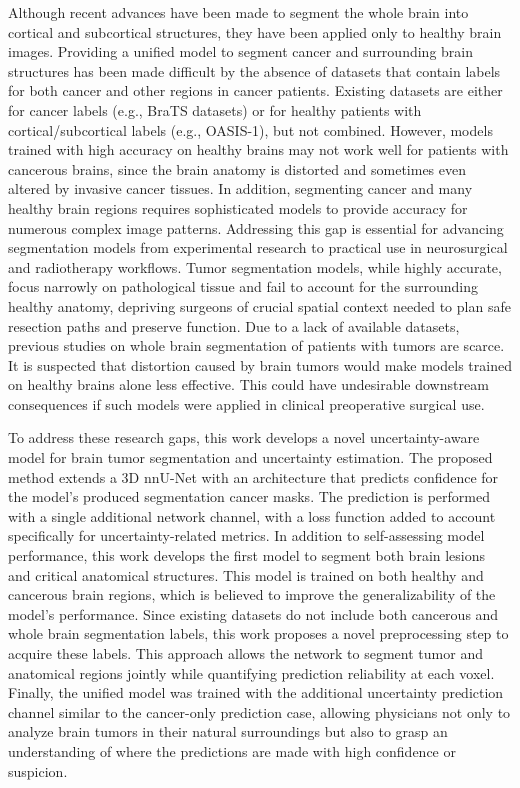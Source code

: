 \documentclass[11pt,letterpaper]{article}
\begin{document}
Although recent advances have been made to segment the whole brain into cortical and subcortical structures, they have been applied only to healthy brain images. Providing a unified model to segment cancer and surrounding brain structures has been made difficult by the absence of datasets that contain labels for both cancer and other regions in cancer patients. Existing datasets are either for cancer labels (e.g., BraTS datasets) or for healthy patients with cortical/subcortical labels (e.g., OASIS-1), but not combined. However, models trained with high accuracy on healthy brains may not work well for patients with cancerous brains, since the brain anatomy is distorted and sometimes even altered by invasive cancer tissues. In addition, segmenting cancer and many healthy brain regions requires sophisticated models to provide accuracy for numerous complex image patterns.
Addressing this gap is essential for advancing segmentation models from experimental research to practical use in neurosurgical and radiotherapy workflows. Tumor segmentation models, while highly accurate, focus narrowly on pathological tissue and fail to account for the surrounding healthy anatomy, depriving surgeons of crucial spatial context needed to plan safe resection paths and preserve function. Due to a lack of available datasets, previous studies on whole brain segmentation of patients with tumors are scarce. It is suspected that distortion caused by brain tumors would make models trained on healthy brains alone less effective. This could have undesirable downstream consequences if such models were applied in clinical preoperative surgical use.

To address these research gaps, this work develops a novel uncertainty-aware model for brain tumor segmentation and uncertainty estimation. The proposed method extends a 3D nnU-Net with an architecture that predicts confidence for the model's produced segmentation cancer masks. The prediction is performed with a single additional network channel, with a loss function added to account specifically for uncertainty-related metrics. In addition to self-assessing model performance, this work develops the first model to segment both brain lesions and critical anatomical structures. This model is trained on both healthy and cancerous brain regions, which is believed to improve the generalizability of the model's performance. Since existing datasets do not include both cancerous and whole brain segmentation labels, this work proposes a novel preprocessing step to acquire these labels. This approach allows the network to segment tumor and anatomical regions jointly while quantifying prediction reliability at each voxel. Finally, the unified model was trained with the additional uncertainty prediction channel similar to the cancer-only prediction case, allowing physicians not only to analyze brain tumors in their natural surroundings but also to grasp an understanding of where the predictions are made with high confidence or suspicion.
\end{document}

